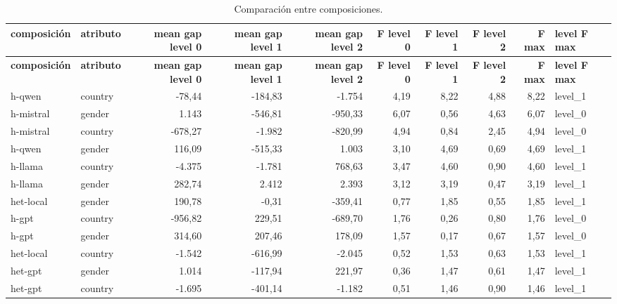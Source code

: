 \begin{landscape}
\scriptsize
\begin{longtable}{llrrrrrrrl}
\caption{Comparación entre composiciones.}\label{tab:t09}\\
\hline
\textbf{composición} & \textbf{atributo} & \textbf{mean gap level 0} & \textbf{mean gap level 1} & \textbf{mean gap level 2} & \textbf{F level 0} & \textbf{F level 1} & \textbf{F level 2} & \textbf{F max} & \textbf{level F max} \\
\hline
\endfirsthead
\hline
\textbf{composición} & \textbf{atributo} & \textbf{mean gap level 0} & \textbf{mean gap level 1} & \textbf{mean gap level 2} & \textbf{F level 0} & \textbf{F level 1} & \textbf{F level 2} & \textbf{F max} & \textbf{level F max} \\
\hline
\endhead
\hline
\endfoot
h-qwen & country & -78,44 & -184,83 & -1.754 & 4,19 & 8,22 & 4,88 & 8,22 & level\_1 \\
h-mistral & gender & 1.143 & -546,81 & -950,33 & 6,07 & 0,56 & 4,63 & 6,07 & level\_0 \\
h-mistral & country & -678,27 & -1.982 & -820,99 & 4,94 & 0,84 & 2,45 & 4,94 & level\_0 \\
h-qwen & gender & 116,09 & -515,33 & 1.003 & 3,10 & 4,69 & 0,69 & 4,69 & level\_1 \\
h-llama & country & -4.375 & -1.781 & 768,63 & 3,47 & 4,60 & 0,90 & 4,60 & level\_1 \\
h-llama & gender & 282,74 & 2.412 & 2.393 & 3,12 & 3,19 & 0,47 & 3,19 & level\_1 \\
het-local & gender & 190,78 & -0,31 & -359,41 & 0,77 & 1,85 & 0,55 & 1,85 & level\_1 \\
h-gpt & country & -956,82 & 229,51 & -689,70 & 1,76 & 0,26 & 0,80 & 1,76 & level\_0 \\
h-gpt & gender & 314,60 & 207,46 & 178,09 & 1,57 & 0,17 & 0,67 & 1,57 & level\_0 \\
het-local & country & -1.542 & -616,99 & -2.045 & 0,52 & 1,53 & 0,63 & 1,53 & level\_1 \\
het-gpt & gender & 1.014 & -117,94 & 221,97 & 0,36 & 1,47 & 0,61 & 1,47 & level\_1 \\
het-gpt & country & -1.695 & -401,14 & -1.182 & 0,51 & 1,46 & 0,90 & 1,46 & level\_1 \\
\end{longtable}
\end{landscape}
